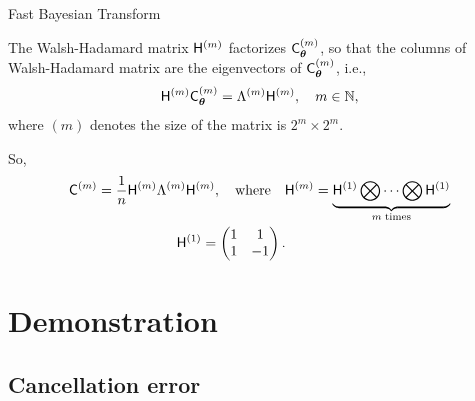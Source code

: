 \documentclass[handout, 10pt,compress,xcolor={usenames,dvipsnames}]{beamer} %
\newcommand{\bm}[1]{\boldsymbol{#1}}
\renewcommand{\mLambda}{\Lambda}
\renewcommand{\vtheta}{{\bm{\theta}}}
\begin{document}
\begin{frame}{Fast Bayesian Transform}
	
	
		The Walsh-Hadamard matrix $\mathsf{H}^{(m)}$ factorizes $\mC_{\vtheta}^{(m)}$, so that the columns of Walsh-Hadamard matrix are the eigenvectors of $\mC_{\vtheta}^{(m)}$, i.e.,
		\vspace{-2ex}
		\begin{align*}
		\mH^{(m)} \mC_{\vtheta}^{(m)}  = \mLambda^{(m)} \mH^{(m)}, \quad m \in \naturals, 
		\end{align*}
		where $(m)$ denotes the size of the matrix is $2^m \times 2^m$.
	
	So,
	\begin{align*}
	\mC^{(m)} &= \frac{1}{n} \mH^{(m)} \mLambda^{(m)} \mH^{(m)}, \quad \text{where} \quad \mH^{({m})} = \underbrace{ \mH^{(1)} \bigotimes \cdots \bigotimes \mH^{(1)} }_{m \; \text{times}}
	\\ 
	& \hspace{2cm}
	\mH^{(1)} =
	\begin{pmatrix}
	1 & 1 \\ 1 & -1
	\end{pmatrix}.
	\end{align*}
\end{frame}










\section{Demonstration}
















\subsection{Cancellation error}
\end{document}
